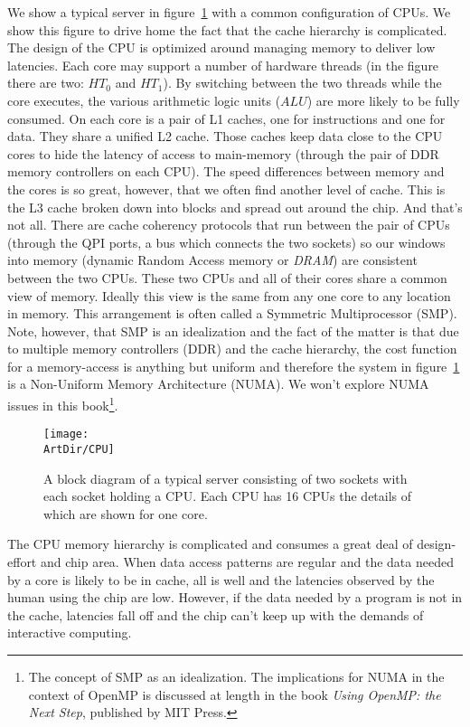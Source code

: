 We show a typical server in figure~\ref{figure:CPU} with a common configuration of CPUs.   
We show this figure to drive home the fact that the cache hierarchy is complicated.  The design
of the CPU is optimized around managing memory to deliver low latencies.   Each core may
support a number of hardware threads (in the figure there are two: $HT_0$ and $HT_1$).  By switching between the two threads
while the core executes, the various arithmetic logic units ($ALU$) are more likely to be fully consumed.
On each core is a pair of L1 caches, one for instructions and one for
data.  They share a unified L2 cache.   Those caches keep data close to the CPU cores to hide the latency
of access to main-memory (through the pair of DDR memory controllers on each CPU).  The speed differences
between memory and the cores is so great, however, that we often find another level of cache.  This is the L3 
cache broken down into blocks and spread out around the chip.   And that's not all.  There are cache coherency
protocols that run between the pair of CPUs (through the QPI ports, a bus which connects the two sockets) 
so our windows into memory (dynamic Random Access memory or \emph{DRAM}) are
consistent between the two CPUs.  These two CPUs and all of their cores share a common view of memory. 
Ideally this view is the same from any one core to any location in memory. This arrangement is often 
called a Symmetric Multiprocessor (SMP).   Note, however, that SMP is an idealization and the fact of the matter
is that due to multiple memory controllers (DDR) and the cache hierarchy, the cost function for a memory-access is
anything but uniform and therefore the system in figure~\ref{figure:CPU} is a Non-Uniform Memory Architecture (NUMA).
We won't explore NUMA issues in this book\footnote{The concept of SMP as an idealization. The implications
for NUMA in the context of OpenMP is discussed at length in the book \emph{Using OpenMP: the Next Step}, published by MIT Press.}.

\begin{figure}[t]
\centerline{\texttt{[image: \\ArtDir/CPU]}}
\caption{A block diagram of a typical server consisting of two sockets with each socket holding a CPU. Each
CPU has 16 CPUs the details of which are shown for one core.}
\label{figure:CPU}
\end{figure}

The CPU memory hierarchy is complicated and consumes a great deal of design-effort and chip area.  
When data access patterns are regular and the data needed by a core is likely to be in cache, all is well and 
the latencies observed by the human using the chip are low.  However, if the data needed by a program is
not in the cache, latencies fall off and the chip can't keep up with the demands of interactive computing.

